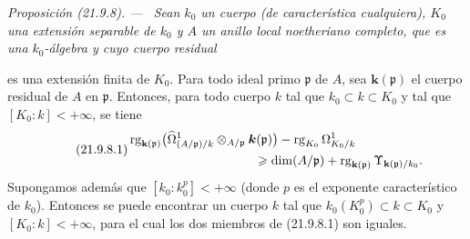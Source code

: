 \documentclass[10pt,oneside]{book}
\makeatletter
\newcommand{\setmanualcurrentlabel}[1]{\def\@currentlabel{#1}}
\newcommand{\oldpage}[2][]{%
  \setcounter{footnote}{0}%
  \marginpar{\scriptsize\textbf{#1}~|~#2}\ignorespaces}
\newenvironment{proposition}[1][]{%
  \setmanualcurrentlabel{#1}\par\medskip\noindent\itshape Proposición (#1). ---\ }{\par}
\makeatother
\begin{document}
\begin{proposition}[21.9.8]
\label{0.21.9.8-es}
Sean $k_0$ un cuerpo (de característica cualquiera), $K_0$ una extensión
separable de $k_0$ y $A$ un anillo local noetheriano completo, que es una
$k_0$-álgebra y cuyo cuerpo residual

\oldpage[0\textsubscript{IV-1}]{182}
es una extensión finita de $K_0$. Para todo ideal primo $\mathfrak p$ de $A$,
sea $\boldsymbol{k}(\mathfrak p)$ el cuerpo residual de $A$ en $\mathfrak p$. Entonces,
para todo cuerpo $k$ tal que $k_0\subset k\subset K_0$ y tal que
$[K_0:k]<+\infty$, se tiene
\begin{equation}
\tag{21.9.8.1}
\label{0.21.9.8.1-es}
\begin{split}
  &\operatorname{rg}_{\mathbf{k}(\mathfrak p)}
    \bigl(\widehat\Omega^1_{(A/\mathfrak p)/k}
      \otimes_{A/\mathfrak p}\boldsymbol k(\mathfrak p)\bigr)
    -\operatorname{rg}_{K_0}\Omega^1_{K_0/k}\\
  &\hspace{35mm}\geqslant
    \dim(A/\mathfrak p)
    +\operatorname{rg}_{\mathbf{k}(\mathfrak p)}\Upsilon_{\mathbf k(\mathfrak p)/k_0}.
\end{split}
\end{equation}
Supongamos además que $[k_0:k_0^p]<+\infty$ (donde $p$ es el exponente
característico de $k_0$). Entonces se puede encontrar un cuerpo $k$ tal que
$k_0(K_0^p)\subset k\subset K_0$ y $[K_0:k]<+\infty$, para el cual los dos
miembros de \textup{(21.9.8.1)} son iguales.
\end{proposition}
\end{document}
